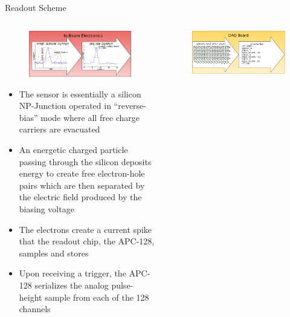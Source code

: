 \documentclass[final]{beamer}
\newlength{\onecolwide}
\newlength{\readoutimgheight}
\newlength{\readoutimgwidth}
\begin{document}
\begin{frame}[t]
\vspace{3.0in}
\begin{exampleblock}{Readout Scheme}
  \begin{columns}[t]
    \begin{column}{\onecolwide}
      \begin{figure}
        \centering
        \includegraphics[height=\readoutimgheight, width=\readoutimgwidth]{figures/Telescope_Data_Flow_Stage_I.pdf}
      \end{figure}
        \begin{itemize}
        \small
        \itemsep0em 
          \item The sensor is essentially a silicon NP-Junction operated in ``reverse-bias'' mode where all free charge carriers are evacuated
          \item An energetic charged particle passing through the silicon deposits energy to create free electron-hole pairs which are then separated by the electric field produced by the biasing voltage
          \item The electrons create a current spike that the readout chip, the APC-128, samples and stores
          \item Upon receiving a trigger, the APC-128 serializes the analog pulse-height sample from each of the 128 channels
        \end{itemize}
    \end{column}
    \begin{column}{\onecolwide}
      \begin{figure}
        \centering
        \includegraphics[height=\readoutimgheight, width=\readoutimgwidth]{figures/Telescope_Data_Flow_Stage_II.pdf}

\end{figure}
\end{column}
\end{columns}
\end{exampleblock}
\end{frame}
\end{document}
